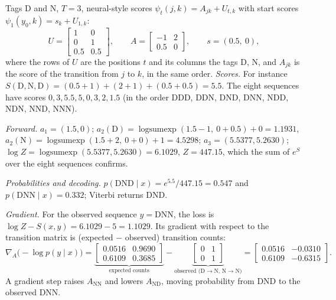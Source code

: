 \begin{notechapter}
\begin{example}\label{crf:ex:small}
Tags D and N, $T = 3$, neural-style scores $\psi_t(j, k) = A_{jk} + U_{t,k}$ with start scores $\psi_1(y_0, k) = s_k + U_{1,k}$:
\[
  U = \begin{bmatrix}1 & 0\\ 0 & 1\\ 0.5 & 0.5\end{bmatrix},\qquad
  A = \begin{bmatrix}-1 & 2\\ 0.5 & 0\end{bmatrix},\qquad s = (0.5,\ 0),
\]
where the rows of $U$ are the positions $t$ and its columns the tags D, N, and $A_{jk}$ is the score of the
transition from $j$ to $k$, in the same order.
\emph{Scores.} For instance $S(\mathrm{D,N,D}) = (0.5 + 1) + (2 + 1) + (0.5 + 0.5) = 5.5$. The eight sequences have scores $0, 3, 5.5, 5, 0, 3, 2, 1.5$
(in the order DDD, DDN, DND, DNN, NDD, NDN, NND, NNN).

\emph{Forward.} $a_1 = (1.5, 0)$; $a_2(\mathrm D) = \operatorname{logsumexp}(1.5 - 1,\ 0 + 0.5) + 0 = 1.1931$, $a_2(\mathrm N) = \operatorname{logsumexp}(1.5 + 2,\ 0 + 0) + 1 = 4.5298$;
$a_3 = (5.5377, 5.2630)$; $\log Z = \operatorname{logsumexp}(5.5377, 5.2630) = 6.1029$, $Z = 447.15$, which the sum of $e^S$ over the eight sequences
confirms.

\emph{Probabilities and decoding.} $p(\mathrm{DND}\mid x) = e^{5.5}/447.15 = 0.547$ and $p(\mathrm{DNN}\mid x) = 0.332$; Viterbi returns DND.

\emph{Gradient.} For the observed sequence $y = \mathrm{DNN}$, the loss is $\log Z - S(x, y) = 6.1029 - 5 = 1.1029$. Its gradient with
respect to the transition matrix is (expected $-$ observed) transition counts:
\[
  \nabla_A\bigl(-\log p(y\mid x)\bigr) = \underbrace{\begin{bmatrix}0.0516 & 0.9690\\ 0.6109 & 0.3685\end{bmatrix}}_{\text{expected counts}}
  - \underbrace{\begin{bmatrix}0 & 1\\ 0 & 1\end{bmatrix}}_{\text{observed (D}\to\text{N, N}\to\text{N)}}
  = \begin{bmatrix}0.0516 & -0.0310\\ 0.6109 & -0.6315\end{bmatrix} .
\]
A gradient step raises $A_{\mathrm{NN}}$ and lowers $A_{\mathrm{ND}}$, moving probability from DND to the observed DNN.
\end{example}


\end{notechapter}
